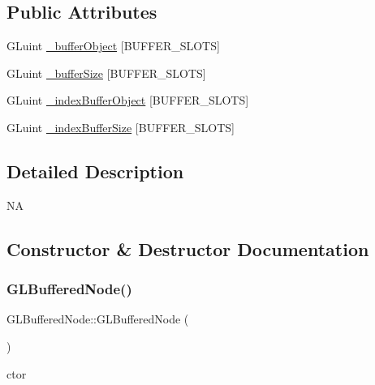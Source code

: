 \subsection*{Public Attributes}
\begin{DoxyCompactItemize}
\item 
G\+Luint \hyperlink{classGLBufferedNode_ada150b7a812ffbb6ae312c28bbfef160}{\+\_\+buffer\+Object} \mbox{[}B\+U\+F\+F\+E\+R\+\_\+\+S\+L\+O\+TS\mbox{]}
\item 
G\+Luint \hyperlink{classGLBufferedNode_ab521b82ecfc51f15a79666f8d2cb994d}{\+\_\+buffer\+Size} \mbox{[}B\+U\+F\+F\+E\+R\+\_\+\+S\+L\+O\+TS\mbox{]}
\item 
G\+Luint \hyperlink{classGLBufferedNode_ad553db4fb3494af4d019b4da934e0659}{\+\_\+index\+Buffer\+Object} \mbox{[}B\+U\+F\+F\+E\+R\+\_\+\+S\+L\+O\+TS\mbox{]}
\item 
G\+Luint \hyperlink{classGLBufferedNode_a9eca43570b0b45f4ab572bc005dcb1fe}{\+\_\+index\+Buffer\+Size} \mbox{[}B\+U\+F\+F\+E\+R\+\_\+\+S\+L\+O\+TS\mbox{]}
\end{DoxyCompactItemize}


\subsection{Detailed Description}
NA 

\subsection{Constructor \& Destructor Documentation}
\mbox{\label{classGLBufferedNode_a2d05ca6744926c28faf9779005ac1ad9}} 
\subsubsection{\texorpdfstring{G\+L\+Buffered\+Node()}{GLBufferedNode()}\hspace{0.1cm}{\footnotesize\ttfamily [1/2]}}
{\footnotesize\ttfamily G\+L\+Buffered\+Node\+::\+G\+L\+Buffered\+Node (\begin{DoxyParamCaption}{ }\end{DoxyParamCaption})}

ctor \mbox{\label{classGLBufferedNode_a96f53c640a040348861086874aa7c680}} 
